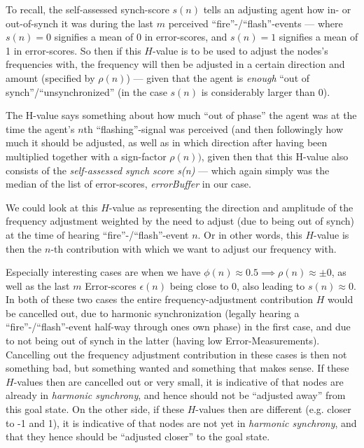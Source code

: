 	To recall, the self-assessed synch-score $s(n)$ tells an adjusting agent how in- or out-of-synch it was during the last $m$ perceived ``fire''-/``flash''-events — where $s(n)=0$ signifies a mean of 0 in error-scores, and $s(n)=1$ signifies a mean of 1 in error-scores. So then if this $H$-value is to be used to adjust the nodes's frequencies with, the frequency will then be adjusted in a certain direction and amount (specified by $\rho(n)$) — given that the agent is \textit{enough} ``out of synch''/``unsynchronized'' (in the case $s(n)$ is considerably larger than 0).
	
	The H-value says something about how much ``out of phase'' the agent was at the time the agent's $n$th ``flashing''-signal was perceived (and then followingly how much it should be adjusted, as well as in which direction after having been multiplied together with a sign-factor $\rho(n))$, given then that this H-value also consists of the \textit{self-assessed synch score s(n)} — which again simply was the median of the list of error-scores, \textit{errorBuffer} in our case.
	
	We could look at this $H$-value as representing the direction and amplitude of the frequency adjustment weighted by the need to adjust (due to being out of synch) at the time of hearing ``fire''-/``flash''-event $n$. Or in other words, this $H$-value is then the $n$-th contribution with which we want to adjust our frequency with.
	
	Especially interesting cases are when we have $\phi(n)\approx0.5 \implies \rho(n)\approx\pm0$, as well as the last $m$ Error-scores $\epsilon(n)$ being close to 0, also leading to $s(n)\approx0$. In both of these two cases the entire frequency-adjustment contribution $H$ would be cancelled out, due to harmonic synchronization (legally hearing a ``fire''-/``flash''-event half-way through ones own phase) in the first case, and due to not being out of synch in the latter (having low Error-Measurements). Cancelling out the frequency adjustment contribution in these cases is then not something bad, but something wanted and something that makes sense. If these $H$-values then are cancelled out or very small, it is indicative of that nodes are already in \textit{harmonic synchrony}, and hence should not be ``adjusted away'' from this goal state. On the other side, if these $H$-values then are different (e.g. closer to -1 and 1), it is indicative of that nodes are not yet in \textit{harmonic synchrony}, and that they hence should be ``adjusted closer'' to the goal state.
	
